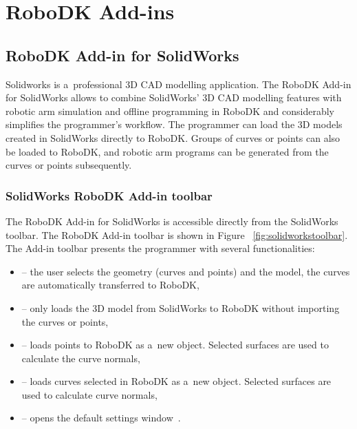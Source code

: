\section{RoboDK Add-ins}

\subsection{RoboDK Add-in for SolidWorks}

Solidworks is a~professional 3D CAD modelling application. The RoboDK Add-in for SolidWorks allows to combine SolidWorks' 3D CAD modelling features with robotic arm simulation and offline programming in RoboDK and considerably simplifies the programmer's workflow. The programmer can load the 3D models created in SolidWorks directly to RoboDK. Groups of curves or points can also be loaded to RoboDK, and robotic arm programs can be generated from the curves or points subsequently.

\subsubsection*{SolidWorks RoboDK Add-in toolbar}

The RoboDK Add-in for SolidWorks is accessible directly from the SolidWorks toolbar.  The RoboDK Add-in toolbar is shown in Figure~ \ref{fig:solidworkstoolbar}. The Add-in toolbar presents the programmer with several functionalities:

\begin{itemize}
    \item {} -- the user selects the geometry (curves and points) and the model, the curves are automatically transferred to RoboDK,
    \item {} -- only loads the 3D model from SolidWorks to RoboDK without importing the curves or points,
    \item {} -- loads points to RoboDK as a~new object. Selected surfaces are used to calculate the curve normals, 
    \item {} --  loads curves selected in RoboDK as a~new object. Selected surfaces are used to calculate curve normals, 
    \item {} -- opens the default settings window~\cite{robodksolidworks}.
\end{itemize}

